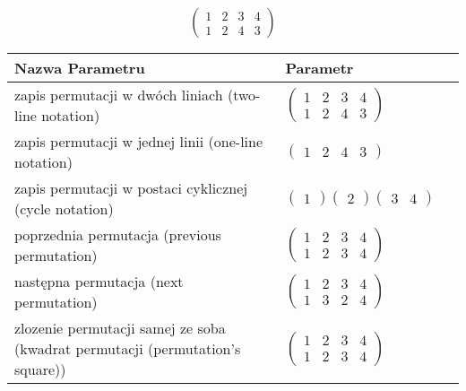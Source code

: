 \documentclass[12pt]{article}
\begin{document}
\subsection{}
\begin{center}
\[
\begin{pmatrix}
	1 & 2 & 3 & 4 \\ 
	1 & 2 & 4 & 3 
\end{pmatrix}
\]

\begin{tabular}{|m{0.6\linewidth}|m{0.4\linewidth}|}
	\hline
	Nazwa Parametru & Parametr \\
	\hline
	zapis permutacji w dwóch liniach (two-line notation) & $\begin{pmatrix} 1 & 2 & 3 & 4 \\ 
1 & 2 & 4 & 3 \end{pmatrix}$ \\ 
	\hline
	zapis permutacji w jednej linii (one-line notation) & $\begin{pmatrix} 1 & 2 & 4 & 3 \end{pmatrix}$ \\ 
	\hline
	zapis permutacji w postaci cyklicznej (cycle notation) & $\begin{pmatrix} 1 \end{pmatrix} \begin{pmatrix} 2 \end{pmatrix} \begin{pmatrix} 3 & 4 \end{pmatrix} $ \\ 
	\hline
	poprzednia permutacja (previous permutation) & $\begin{pmatrix} 1 & 2 & 3 & 4 \\ 
1 & 2 & 3 & 4 \end{pmatrix}$ \\ 
	\hline
	następna permutacja (next permutation) & $\begin{pmatrix} 1 & 2 & 3 & 4 \\ 
1 & 3 & 2 & 4 \end{pmatrix}$ \\ 
	\hline
	zlozenie permutacji samej ze soba (kwadrat permutacji (permutation's square)) & $\begin{pmatrix} 1 & 2 & 3 & 4 \\ 
1 & 2 & 3 & 4 \end{pmatrix}$ \\ 
	\hline
\end{tabular}
\end{center}
\end{document}
